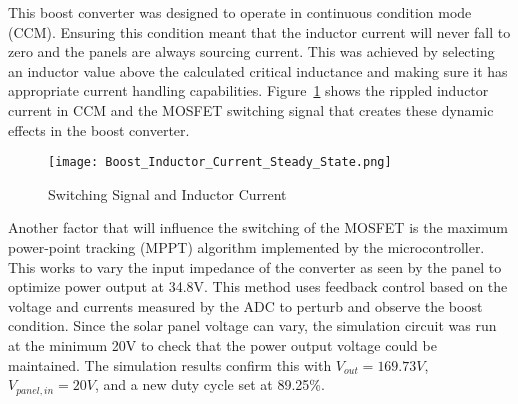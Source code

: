 This boost converter was designed to operate in continuous condition mode (CCM). Ensuring this condition meant that the inductor current will never fall to zero and the panels are always sourcing current. This was achieved by selecting an inductor value above the calculated critical inductance and making sure it has appropriate current handling capabilities. Figure~\ref{Figure c} shows the rippled inductor current in CCM and the MOSFET switching signal that creates these dynamic effects in the boost converter. 

\begin{figure}
\centering
\texttt{[image: Boost\_Inductor\_Current\_Steady\_State.png]}
\caption{Switching Signal and Inductor Current}
\label{Figure c}
\end{figure}

Another factor that will influence the switching of the MOSFET is the maximum power-point tracking (MPPT) algorithm implemented by the microcontroller. This works to vary the input impedance of the converter as seen by the panel to optimize power output at 34.8V. This method uses feedback control based on the voltage and currents measured by the ADC to perturb and observe the boost condition. Since the solar panel voltage can vary, the simulation circuit was run at the minimum 20V to check that the power output voltage could be maintained. The simulation results confirm this with $V_{out}=169.73V$, $V_{panel,in}=20V$, and a new duty cycle set at 89.25\%.

